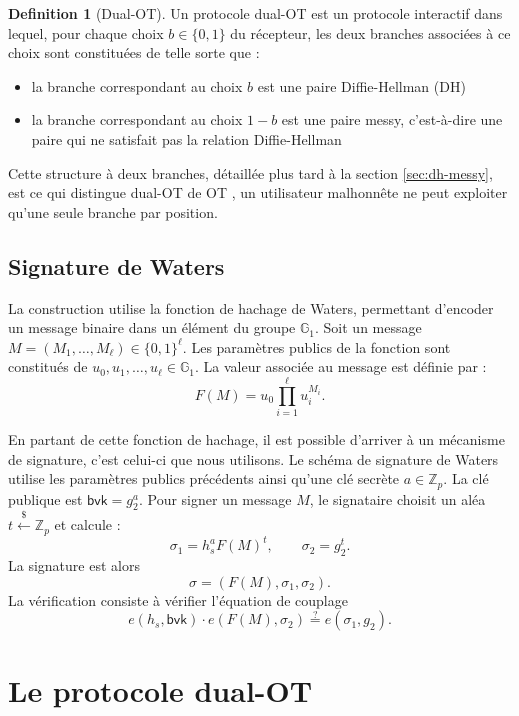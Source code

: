 \documentclass[10pt,a4paper]{article}
\theoremstyle{definition}
\newtheorem{definition}{Definition}[section]
\theoremstyle{plain}
\theoremstyle{remark}
\newcommand{\sample}{\xleftarrow{\$}}
\begin{document}
\begin{definition}[Dual-OT]
Un protocole dual-OT est un protocole interactif dans lequel,
pour chaque choix $b\in\{0,1\}$ du récepteur, les deux branches
associées à ce choix sont constituées de telle sorte que :
\begin{itemize}
    \item la branche correspondant au choix $b$ est une paire
    Diffie-Hellman (DH) \cite{diffiehellman1976}
    \item la branche correspondant au choix $1-b$ est une paire
    messy, c'est-à-dire une paire qui ne satisfait pas la
    relation Diffie-Hellman
\end{itemize}
\end{definition}

Cette structure à deux branches, détaillée plus tard à la section \ref{sec:dh-messy}, est
ce qui distingue dual-OT de OT \cite{pvw2007}, un utilisateur malhonnête ne peut
exploiter qu'une seule branche par position.


\subsection{Signature de Waters}

La construction utilise la fonction de hachage de Waters, permettant
d'encoder un message binaire dans un élément du groupe $\mathbb{G}_1$.
Soit un message
$
M=(M_1,\ldots,M_\ell)\in\{0,1\}^{\ell}.
$
Les paramètres publics de la fonction sont constitués de
$
u_0,u_1,\ldots,u_\ell\in\mathbb{G}_1 .
$
La valeur associée au message est définie par :
\[
F(M)=u_0\prod_{i=1}^{\ell}u_i^{M_i}.
\]

En partant de cette fonction de hachage,
il est possible d'arriver à un mécanisme de signature,
c'est celui-ci que nous utilisons.
Le schéma de signature de Waters \cite{waters2005} utilise les paramètres publics
précédents ainsi qu'une clé secrète $a\in\mathbb{Z}_p$.
La clé publique est 
$
\mathsf{bvk}=g_2^a .
$
Pour signer un message $M$, le signataire choisit un aléa
$t\sample\mathbb{Z}_p$ et calcule :
\[
\sigma_1=h_s^a F(M)^t,
\qquad
\sigma_2=g_2^t .
\]
La signature est alors 
\[
\sigma=(F(M),\sigma_1,\sigma_2).
\]
La vérification consiste à vérifier l'équation de couplage 
\[
e(h_s,\mathsf{bvk})\cdot e(F(M),\sigma_2)
\stackrel{?}{=}
e(\sigma_1,g_2).
\]

\section{Le protocole dual-OT}
\end{document}
